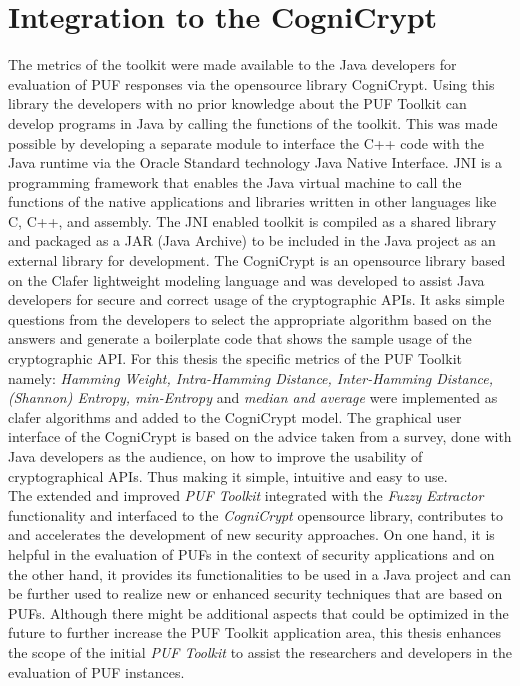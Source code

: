 \section{Integration to the CogniCrypt}
The metrics of the toolkit were made available to the Java developers for evaluation of PUF responses via the opensource library CogniCrypt. Using this library the developers with no prior knowledge about the PUF Toolkit can develop programs in Java by calling the functions of the toolkit. This was made possible by developing a separate module to interface the C++ code with the Java runtime via the Oracle Standard technology Java Native Interface. JNI is a programming
framework that enables the Java virtual machine to call the functions of the native applications and libraries written in other languages like C, C++, and assembly. The JNI enabled toolkit is compiled as a shared library and packaged as a JAR (Java Archive) to be included in the Java project as an external library for development. The CogniCrypt is an opensource library \cite{cogni} based on the Clafer lightweight modeling language \cite{clafer} and was developed to assist Java developers for secure and correct usage of the cryptographic APIs. It asks
simple questions from the developers to select the appropriate algorithm based on the answers and generate a boilerplate code that shows the sample usage of the cryptographic API. For this thesis the specific metrics of the PUF Toolkit namely: \emph{Hamming Weight, Intra-Hamming Distance, Inter-Hamming Distance, (Shannon) Entropy, min-Entropy} and \emph{median and average} were implemented as clafer algorithms and added to the CogniCrypt model. The graphical user interface of the
CogniCrypt is based on the advice taken from a survey, done with Java developers as the audience, on how to improve the usability of cryptographical APIs. Thus making it simple, intuitive and easy to use.\\

The extended and improved \emph{PUF Toolkit} integrated with the \emph{Fuzzy Extractor} functionality and interfaced to the \emph{CogniCrypt} opensource library, contributes to and accelerates the development of new security approaches. On one hand, it is helpful in the evaluation of PUFs in the context of security applications and on the other hand, it provides its functionalities to be used in a Java project and can be further used to realize new or enhanced security techniques that
are based on PUFs. Although there might be additional aspects that could be optimized in the future to further increase the PUF Toolkit application area, this thesis enhances the scope of the initial \emph{PUF Toolkit} to assist the researchers and developers in the evaluation of PUF instances.

